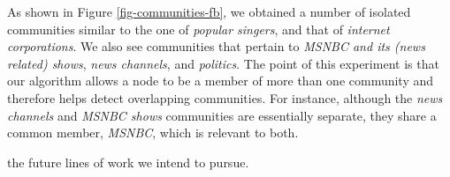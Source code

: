 As shown in Figure \ref{fig-communities-fb}, we obtained a number of isolated communities similar to the one of {\it popular singers}, and that of {\it internet corporations}. We also see communities that pertain to {\it MSNBC and its (news related) shows}, {\it news channels}, and {\it politics}. The point of this experiment is that our algorithm allows a node to be a member of more than one community and therefore helps detect overlapping communities. For instance, although the {\it news channels} and {\it MSNBC shows} communities are essentially separate, they share a common member, {\it MSNBC}, which is relevant to both. 
%
%
%

the future lines of work we intend to pursue. 




